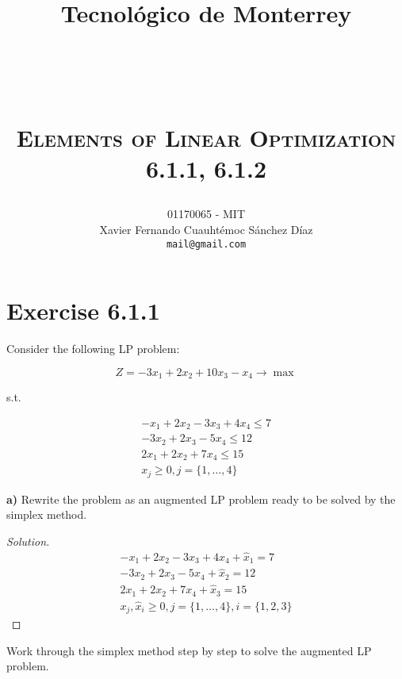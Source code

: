 \documentclass[titlepage, letterpaper, fleqn]{article}
\title{
\vspace{1in}
\textbf{Tecnológico de Monterrey} \\
\vspace{0.5in}
\textmd{\mahclass} \\
\large{\textit{\mahteacher}} \\
\vspace{0.5in}
\textsc{\mahtitle}\\
\textsc{Elements of Linear Optimization}\\
\textsc{6.1.1, 6.1.2}\\
\author{01170065  - MIT \\
Xavier Fernando Cuauhtémoc Sánchez Díaz \\
\texttt{mail@gmail.com}}
\date{\mahdate}
}
\newcommand{\spacepls}{\vspace{5mm}}
\renewcommand\qedsymbol{\(\blacksquare\)}
\newenvironment{solution}
{\renewcommand\qedsymbol{$\square$}\begin{proof}[Solution]}
{\end{proof}}
\begin{document}
\begin{titlepage}
\maketitle
\end{titlepage}

%
%

\section{Exercise 6.1.1}

{\large Consider the following LP problem:

$$Z = -3x_1 + 2x_2 + 10x_3 - x_4 \to \max$$

s.t.

\begin{align*}
    -x_1 + 2x_2 -3x_3 + 4x_4 \leq 7 \\
    -3x_2 + 2x_3 - 5x_4 \leq 12 \\
    2x_1 + 2x_2 + 7x_4 \leq 15 \\
    x_j \geq 0, j = \{1, \dots , 4\}
\end{align*}

\textbf{a)} Rewrite the problem as an augmented LP problem ready to be solved by the simplex method.}

\begin{solution}
\begin{align*}
    -x_1 + 2x_2 -3x_3 + 4x_4 + \widehat{x}_1 = 7 \\
    -3x_2 + 2x_3 - 5x_4 + \widehat{x}_2 =  12 \\
    2x_1 + 2x_2 + 7x_4 + \widehat{x}_3 =  15 \\
    x_j, \widehat{x}_i \geq 0, j = \{1, \dots , 4\}, i = \{1, 2 , 3\}
\end{align*}

\end{solution}

\spacepls

{\large Work through the simplex method step by step to solve the augmented LP problem.}
\end{document}
